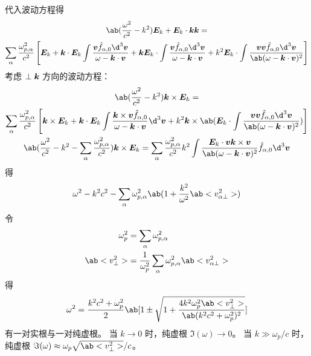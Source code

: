 代入波动方程得
\begin{equation}\begin{gathered}
\ab(\frac{\omega^2}{c^2} - k^2) \vector{E}_k
+ \vector{E}_k \cdot \vector{k}\vector{k}
= \\
\sum_\alpha \frac{\omega_{p,\alpha}^2}{c^2}
\left[ \vector{E}_k
+ \vector{k} \cdot \vector{E}_k \int
    \frac{\vector{v} \hat{f}_{\alpha,0} \d^3\vector{v}}
    {\omega-\vector{k}\cdot\vector{v}}
+ \vector{k} \vector{E}_k \cdot \int
    \frac{\vector{v} \hat{f}_{\alpha,0} \d^3\vector{v}}
    {\omega-\vector{k}\cdot\vector{v}}
+ k^2 \vector{E}_k \cdot \int
    \frac{\vector{v}\vector{v} \hat{f}_{\alpha,0} \d^3\vector{v}}
    {\ab(\omega-\vector{k}\cdot\vector{v})^2}
\right]
\end{gathered}\end{equation}
考虑 $\perp\bm{k}$ 方向的波动方程：
\begin{equation}\begin{gathered}
\ab(\frac{\omega^2}{c^2} - k^2) \vector{k}\times\vector{E}_k
= \\
\sum_\alpha \frac{\omega_{p,\alpha}^2}{c^2}
\left[ \vector{k}\times\vector{E}_k
+ \vector{k} \cdot \vector{E}_k \int
    \frac{\vector{k}\times\vector{v} \hat{f}_{\alpha,0}}
    {\omega-\vector{k}\cdot\vector{v}} \d^3\vector{v}
+ k^2 \vector{k}\times \ab(\vector{E}_k \cdot \int
    \frac{\vector{v}\vector{v} \hat{f}_{\alpha,0} \d^3\vector{v}}
    {\ab(\omega-\vector{k}\cdot\vector{v})^2})
\right] \\
\ab(\frac{\omega^2}{c^2} - k^2
- \sum_\alpha \frac{\omega_{p,\alpha}^2}{c^2})
\vector{k} \times \vector{E}_k
= \sum_\alpha \frac{\omega_{p,\alpha}^2}{c^2}k^2 \int
    \frac{\vector{E}_k \cdot \vector{v} \vector{k} \times \vector{v}}
    {\ab(\omega-\vector{k}\cdot\vector{v})^2}
\hat{f}_{\alpha,0} \d^3\vector{v}
\end{gathered}\end{equation}
得
\begin{equation}
\omega^2 - k^2 c^2 - \sum_\alpha \omega_{p,\alpha}^2 \ab(
    1 + \frac{k^2}{\omega^2} \ab<v_{\alpha\perp}^2>
)
\end{equation}
令
\begin{subequations}\begin{align}
\omega_p^2 &= \sum_\alpha \omega_{p,\alpha}^2 \\
\ab<v_\perp^2> &= \frac{1}{\omega_p^2}
    \sum_\alpha \omega_{p,\alpha}^2 \ab<v_{\alpha\perp}^2>
\end{align}\end{subequations}
得
\begin{equation}
\omega^2 = \frac{k^2 c^2 + \omega_p^2}{2} \ab[
    1 \pm \sqrt{1 + 
        \frac{4 k^2 \omega_p^2 \ab<v_\perp^2>}
        {\ab(k^2 c^2 + \omega_p^2)^2}
}]
\end{equation}
有一对实根与一对纯虚根。
当 $k \to 0$ 时，纯虚根 $\Im(\omega) \to 0$。
当 $k \gg \omega_p/c$ 时，纯虚根 $\Im(\omega) \approx \omega_p \sqrt{\ab<v_\perp^2>}/c$。
